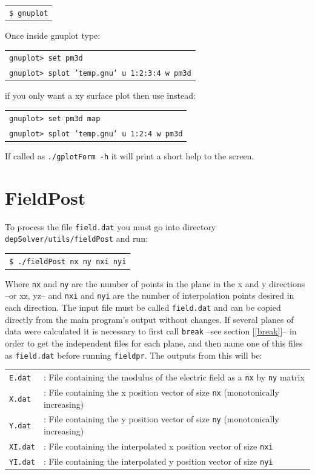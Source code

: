 \documentclass[12pt]{report}
\begin{document}
\begin{tabular}{l}
\verb+$ gnuplot+
\end{tabular}

Once inside gnuplot type:

\begin{tabular}{l}
\texttt{gnuplot> set pm3d}\\
\texttt{gnuplot> splot 'temp.gnu' u 1:2:3:4 w pm3d}
\end{tabular}

if you only want a xy surface plot then use instead:

\begin{tabular}{l}
\texttt{gnuplot> set pm3d map}\\
\texttt{gnuplot> splot 'temp.gnu' u 1:2:4 w pm3d}
\end{tabular}

If called as \verb+./gplotForm -h+ it will print a short help to the screen.

\section{FieldPost}
To process the file \verb+field.dat+ you must go into directory \verb+depSolver/utils/fieldPost+ and run:

\begin{tabular}{l}
\texttt{\$ ./fieldPost nx ny nxi nyi}
\end{tabular}

Where \verb+nx+ and \verb+ny+ are the number of points in the plane in the x and y directions --or xz, yz-- and \verb+nxi+ and \verb+nyi+ are the number of interpolation points desired in each direction. The input file must be called \verb+field.dat+ and can be copied directly from the main program's output without changes. If several planes of data were calculated it is necessary to first call \verb+break+ --see section [\ref{break}]-- in order to get the independent files for each plane, and then name one of this files as \verb+field.dat+ before running \verb+fieldpr+. The outputs from this will be:

\begin{tabular}{ll}
\texttt{E.dat} &: File containing the modulus of the electric field as a \verb+nx+ by \verb+ny+ matrix\\
\texttt{X.dat} &: File containing the x position vector of size \verb+nx+ (monotonically increasing)\\
\texttt{Y.dat} &: File containing the y position vector of size \verb+ny+ (monotonically increasing)\\
\texttt{XI.dat} &: File containing the interpolated x position vector of size \verb+nxi+\\
\texttt{YI.dat} &: File containing the interpolated y position vector of size \verb+nyi+
\end{tabular}
\end{document}
